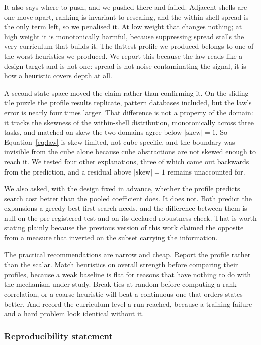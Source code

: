 \documentclass{article}
\begin{document}
It also says where to push, and we pushed there and failed. Adjacent shells are
one move apart, ranking is invariant to rescaling, and the within-shell spread is
the only term left, so we penalised it. At low weight that changes nothing; at
high weight it is monotonically harmful, because suppressing spread stalls the
very curriculum that builds it. The flattest profile we produced belongs to one
of the worst heuristics we produced. We report this because the law reads like a
design target and is not one: spread is not noise contaminating the signal, it is
how a heuristic covers depth at all.

A second state space moved the claim rather than confirming it. On the
sliding-tile puzzle the profile results replicate, pattern databases included,
but the law's error is nearly four times larger. That difference is not a property of
the domain: it tracks the skewness of the within-shell distribution,
monotonically across three tasks, and matched on skew the two domains agree below
$|\mathrm{skew}|=1$. So Equation~\ref{eq:law} is skew-limited, not cube-specific,
and the boundary was invisible from the cube alone because cube abstractions are
not skewed enough to reach it. We tested four other explanations, three of which
came out backwards from the prediction, and a residual above
$|\mathrm{skew}|=1$ remains unaccounted for.

We also asked, with the design fixed in advance, whether the profile predicts
search cost better than the pooled coefficient does. It does not. Both predict
the expansions a greedy best-first search needs, and the difference between them
is null on the pre-registered test and on its declared robustness check. That is
worth stating plainly because the previous version of this work claimed the
opposite from a measure that inverted on the subset carrying the information.

The practical recommendations are narrow and cheap. Report the profile rather
than the scalar. Match heuristics on overall strength before comparing their
profiles, because a weak baseline is flat for reasons that have nothing to do
with the mechanism under study. Break ties at random before computing a rank
correlation, or a coarse heuristic will beat a continuous one that orders states
better. And record the curriculum level a run reached, because a training
failure and a hard problem look identical without it.

\subsubsection*{Reproducibility statement}
\end{document}
